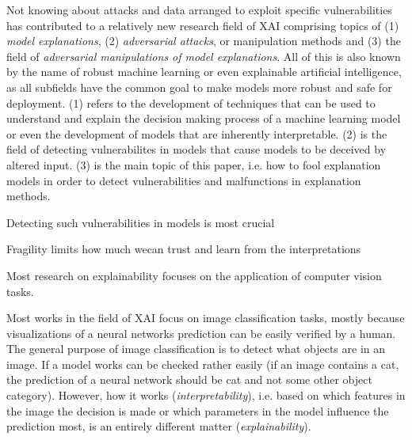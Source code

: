 



Not knowing about attacks and data arranged to exploit specific vulnerabilities has contributed to a relatively new research field of XAI comprising topics of (1) \textit{model explanations}, (2) \textit{adversarial attacks}, or manipulation methods and (3) the field of \textit{adversarial manipulations of model explanations}. All of this is also known by the name of robust machine learning or even explainable artificial intelligence, as all subfields have the common goal to make models more robust and safe for deployment. 
(1) refers to the development of techniques that can be used to understand and explain the decision making process of a machine learning model or even the development of models that are inherently interpretable. (2) is the field of detecting vulnerabilites in models that cause models to be deceived by altered input. 
(3) is the main topic of this paper, i.e. how to fool explanation models in order to detect vulnerabilities and malfunctions in explanation methods. 

Detecting such vulnerabilities in models is most crucial 

Fragility limits how much wecan trust and learn from the interpretations



Most research on explainability focuses on the application of computer vision tasks. 

Most works in the field of XAI focus on image classification tasks, mostly because visualizations of a neural networks prediction can be easily verified by a human. The general purpose of image classification is to detect what objects are in an image. If a model works can be checked rather easily (if an image contains a cat, the prediction of a neural network should be cat and not some other object category). However, how it works (\textit{interpretability}), i.e. based on which features in the image the decision is made or which parameters in the model influence the prediction most, is an entirely different matter (\textit{explainability}).  


